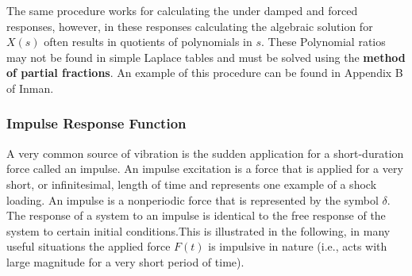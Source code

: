 \documentclass[12pt,letter]{article}
\numberwithin{ex}{section} %
\numberwithin{re}{section} %
\newcommand{\Laplace}[1]{\ensuremath{\mathcal{L}{\left[#1\right]}}}
\begin{document}
The same procedure works for calculating the under damped and forced responses, however, in these responses calculating the algebraic solution for $X(s)$ often results in quotients of polynomials in $s$. These Polynomial ratios may not be found in simple Laplace tables and must be solved using the \textbf{method of partial fractions}. An example of this procedure can be found in Appendix B of Inman. 


\subsubsection{Impulse Response Function}
A very common source of vibration is the sudden application for a short-duration force called an impulse. An impulse excitation is a force that is applied for a very short, or infinitesimal, length of time and represents one example of a shock loading. An impulse is a nonperiodic force that is represented by the symbol $\delta$. The response of a system to an impulse is identical to the free response of the system to certain initial conditions.This is illustrated in the following, in many useful situations the applied force $F(t)$ is impulsive in nature
(i.e., acts with large magnitude for a very short period of time).
\end{document}
